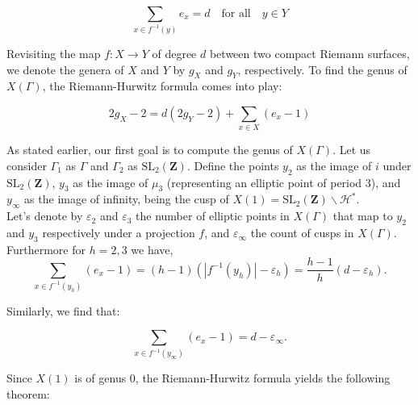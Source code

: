 \[
\sum_{x \in f^{-1}(y)} e_{x} = d \quad \text{for all} \quad y \in Y
\]

Revisiting the map \( f: X \rightarrow Y \) of degree \( d \) between two compact Riemann surfaces, we denote the genera of \( X \) and \( Y \) by \( g_{X} \) and \( g_{Y} \), respectively. To find the genus of \( X(\Gamma) \), the Riemann-Hurwitz formula comes into play:

\[
2 g_{X} - 2 = d(2 g_{Y} - 2) + \sum_{x \in X}(e_{x} - 1)
\]

As stated earlier, our first goal is to compute the genus of $X(\Gamma).$ Let us consider \( \Gamma_{1} \) as \( \Gamma \) and \( \Gamma_{2} \) as \( \mathrm{SL}_{2}(\mathbf{Z}) \). Define the points \( y_{2} \) as the image of \( i \) under \( \mathrm{SL}_{2}(\mathbf{Z}) \), \( y_{3} \) as the image of \( \mu_{3} \) (representing an elliptic point of period 3), and \( y_{\infty} \) as the image of infinity, being the cusp of \( X(1) = \mathrm{SL}_{2}(\mathbf{Z}) \backslash \mathcal{H}^{*} \). \\

Let's denote by \( \varepsilon_{2} \) and \( \varepsilon_{3} \) the number of elliptic points in \( X(\Gamma) \) that map to \( y_{2} \) and \( y_{3} \) respectively under a projection \( f \), and \( \varepsilon_{\infty} \) the count of cusps in \( X(\Gamma) \). Furthermore for $h=2,3$ we have, 
\[
\sum_{x \in f^{-1}(y_{h})}(e_{x} - 1) = (h - 1)(|f^{-1}(y_{h})| - \varepsilon_{h}) = \frac{h - 1}{h}(d - \varepsilon_{h}).
\]

Similarly, we find that:

\[
\sum_{x \in f^{-1}(y_{\infty})}(e_{x} - 1) = d - \varepsilon_{\infty}.
\]

Since \( X(1) \) is of genus 0, the Riemann-Hurwitz formula yields the following theorem:

